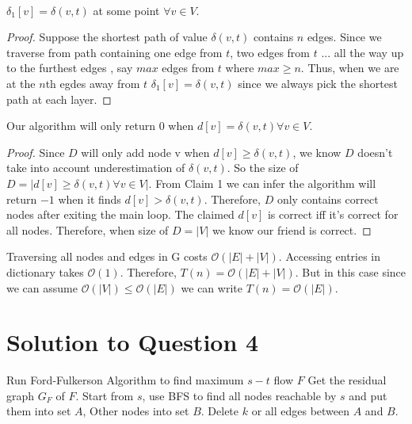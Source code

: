 \documentclass[11pt]{article}
\renewcommand{\O}{\mathcal{O}}
\begin{document}
\\

 $\delta_1[v] = \delta(v, t)$ at some point $\forall v \in V$.

\begin{proof}
	
Suppose the shortest path of value $\delta(v, t)$ contains $n$ edges. Since we traverse from path containing one edge from $t$, two edges from $t$ ... all the way up to the furthest edges , say $max$ edges from $t$ where $max \geq n$. Thus, when we are at the $n$th egdes away from $t$ $\delta_1[v] = \delta(v, t)$ since we always pick the shortest path at each layer.	

\end{proof}

 Our algorithm will only return $0$ when $d[v] = \delta(v, t) \forall v \in V$.

\begin{proof}
	
Since $D$ will only add node v when $d[v] \geq \delta(v, t)$, we know $D$ doesn't take into account underestimation of $\delta(v, t)$. So the size of $D = |d[v] \geq \delta(v, t) \forall v \in V|$. From Claim 1 we can infer the algorithm will return $-1$ when it finds $d[v] > \delta(v, t)$. Therefore, $D$ only contains correct nodes after exiting the main loop. The claimed $d[v]$ is correct iff it's correct for all nodes. Therefore, when size of $D = |V|$ we know our friend is correct.

\end{proof}

 Traversing all nodes and edges in G costs $\O(|E| + |V|)$. Accessing entries in dictionary takes $\O(1)$. Therefore, $T(n) = \O(|E| + |V|)$. But in this case since we can assume $\O(|V|) \leq \O(|E|)$ we can write $T(n) = \O(|E|)$.

\newpage
\section{Solution to Question 4}


\begin{algorithm}
	\begin{algorithmic}
		\State Run Ford-Fulkerson Algorithm to find maximum $s-t$ flow $F$
		\State Get the residual graph $G_F$ of $F$.
		\State Start from $s$, use BFS to find all nodes reachable by $s$ and put them into set $A$, Other nodes into set $B$.
		\State Delete $k$ or all edges between $A$ and $B$.
	\end{algorithmic}
\end{algorithm}
\end{document}
